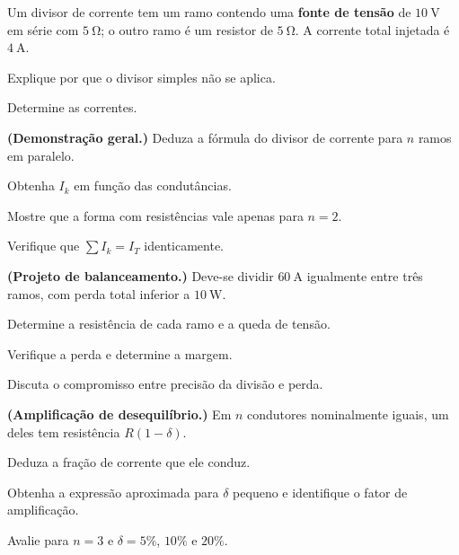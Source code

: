 \begin{questao}[3]{}

Um divisor de corrente tem um ramo contendo uma \textbf{fonte de tensão} de
$\SI{10}{\volt}$ em série com $\SI{5}{\ohm}$; o outro ramo é um resistor de
$\SI{5}{\ohm}$. A corrente total injetada é $\SI{4}{\ampere}$.
\begin{itensq}
\item Explique por que o divisor simples não se aplica.
\item Determine as correntes.
\end{itensq}


\end{questao}

\blocodesafio
\begin{questao}[4]{}

\textbf{(Demonstração geral.)} Deduza a fórmula do divisor de corrente para
$n$ ramos em paralelo.
\begin{itensq}
\item Obtenha $I_k$ em função das condutâncias.
\item Mostre que a forma com resistências vale apenas para $n=2$.
\item Verifique que $\sum I_k=I_T$ identicamente.
\end{itensq}


\end{questao}
\begin{questao}[4]{}

\textbf{(Projeto de balanceamento.)} Deve-se dividir $\SI{60}{\ampere}$
igualmente entre três ramos, com perda total inferior a $\SI{10}{\watt}$.
\begin{itensq}
\item Determine a resistência de cada ramo e a queda de tensão.
\item Verifique a perda e determine a margem.
\item Discuta o compromisso entre precisão da divisão e perda.
\end{itensq}


\end{questao}
\begin{questao}[4]{}

\textbf{(Amplificação de desequilíbrio.)} Em $n$ condutores nominalmente
iguais, um deles tem resistência $R(1-\delta)$.
\begin{itensq}
\item Deduza a fração de corrente que ele conduz.
\item Obtenha a expressão aproximada para $\delta$ pequeno e identifique o fator
      de amplificação.
\item Avalie para $n=3$ e $\delta=5\%$, $10\%$ e $20\%$.
\end{itensq}


\end{questao}
